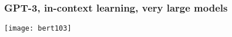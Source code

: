 \begin{frame}[fragile]\frametitle{GPT-3, in-context learning, very large models}


			\begin{center}
			\texttt{[image: bert103]}
			\end{center}		
			

\end{frame}
